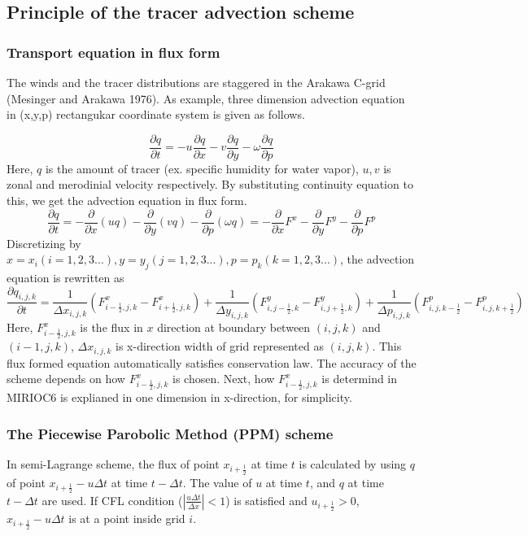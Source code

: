 \documentclass{article}
\begin{document}
\subsection{Principle of the tracer advection scheme}
\subsubsection{Transport equation in flux form}
The winds and the tracer distributions are staggered in the Arakawa C-grid (Mesinger and Arakawa 1976).
As example, three dimension advection equation in (x,y,p) rectangukar coordinate system is given as follows. 

\begin{equation}
\frac{\partial q}{\partial t} = -u \frac{\partial q}{\partial x}-v \frac{\partial q}{\partial y}-\omega \frac{\partial q}{\partial p}
\end{equation}
Here, $q$ is the amount of tracer (ex. specific humidity for water vapor), $u,v$ is zonal and merodinial velocity respectively.
By substituting continuity equation to this, we get the advection equation in flux form.
\begin{equation}
  \frac{\partial q}{\partial t}=-\frac{\partial}{\partial x}(uq)-\frac{\partial}{\partial y}(vq)-\frac{\partial}{\partial p}(\omega q)
  =-\frac{\partial}{\partial x}F^{x}-\frac{\partial}{\partial y}F^{y}-\frac{\partial}{\partial p}F^{p}
\end{equation}
Discretizing by $x=x_{i} (i=1,2,3...), y=y_{j} (j=1,2,3...), p=p_{k} (k=1,2,3...)$, the advection equation is rewritten as
\begin{equation}
  \frac{\partial q_{i,j,k}}{\partial t}=\frac{1}{\Delta x_{i,j,k}}(F^{x}_{i-\frac{1}{2},j,k}-F^{x}_{i+\frac{1}{2},j,k})+\frac{1}{\Delta y_{i,j,k}}(F^{y}_{i,j-\frac{1}{2},k}-F^{y}_{i,j+\frac{1}{2},k})+\frac{1}{\Delta p_{i,j,k}}(F^{p}_{i,j,k-\frac{1}{2}}-F^{p}_{i,j,k+\frac{1}{2}})
\end{equation}
Here, $F^{x}_{i-\frac{1}{2},j,k}$ is the flux in $x$ direction at boundary between $(i,j,k)$ and $(i-1,j,k)$, $\Delta x_{i,j,k}$ is x-direction width of grid represented as $(i,j,k)$.
This flux formed equation automatically satisfies conservation law. 
The accuracy of the scheme depends on how $F^{x}_{i-\frac{1}{2},j,k}$ is chosen.
Next, how $F^{x}_{i-\frac{1}{2},j,k}$ is determind in MIRIOC6 is explianed in one dimension in x-direction, for simplicity. 
\subsubsection{The Piecewise Parobolic Method (PPM) scheme}
In semi-Lagrange scheme, the flux of point $x_{i+\frac{1}{2}}$ at time $t$ is calculated by using $q$ of point $x_{i+\frac{1}{2}}-u\Delta t$ at time $t-\Delta t$.
The value of $u$ at time $t$, and $q$ at time $t-\Delta t$ are used.
If CFL condition ($|\frac{u\Delta t}{\Delta x}|<1$) is satisfied and $u_{i+\frac{1}{2}}>0$, $x_{i+\frac{1}{2}}-u\Delta t$ is at a point inside grid $i$.
\end{document}
